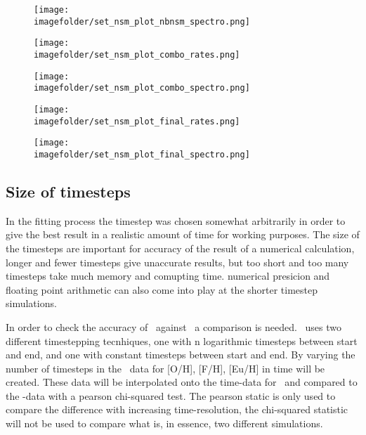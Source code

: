 \begin{figure}[h]
  \centering
  \texttt{[image: \\imagefolder/set\_nsm\_plot\_nbnsm\_spectro.png]}
  \caption{\label{fig:fit-v3-number-euro}}
\end{figure}
\begin{figure}[h]
  \centering
  \texttt{[image: \\imagefolder/set\_nsm\_plot\_combo\_rates.png]}
  \caption{\label{fig:fit-v3-combo-nsmr}}
\end{figure}
\begin{figure}[h]
  \centering
  \texttt{[image: \\imagefolder/set\_nsm\_plot\_combo\_spectro.png]}
  \caption{\label{fig:fit-v3-combo-euro}}
\end{figure}
\begin{figure}[h]
  \centering
  \texttt{[image: \\imagefolder/set\_nsm\_plot\_final\_rates.png]}
  \caption{\label{fig:fit-v3-nsmr}}
\end{figure}
\begin{figure}[h]
  \centering
  \texttt{[image: \\imagefolder/set\_nsm\_plot\_final\_spectro.png]}
  \caption{\label{fig:fit-v3-final-euro}}
\end{figure}

\FloatBarrier
\subsection{Size of timesteps}
In the fitting process the timestep was chosen somewhat arbitrarily in order to give the best result in a realistic amount of time for working purposes. The size of the timesteps are important for accuracy of the result of a numerical calculation, longer and fewer timesteps give unaccurate results, but too short and too many timesteps take much memory and comupting time. numerical presicion and floating point arithmetic can also come into play at the shorter timestep simulations.

In order to check the accuracy of \omegamodel\ against \eris\ a comparison is needed.
\omegamodel\ uses two different timestepping tecnhiques, one with n logarithmic timesteps between start and end, and one with constant timesteps between start and end.
By varying the number of timesteps in the \omegamodel\ data for [O/H], [F/H], [Eu/H] in time will be created.
These data will be interpolated onto the time-data for \eris\ and compared to the \eris-data with a pearson chi-squared test. The pearson static is only used to compare the difference with increasing time-resolution, the chi-squared statistic will not be used to compare what is, in essence, two different simulations.

